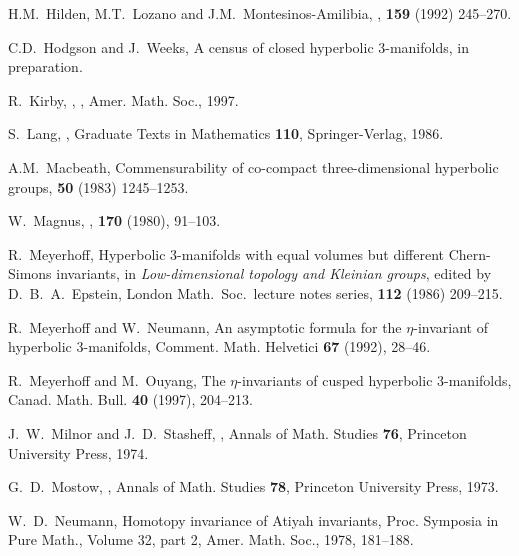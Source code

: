 \documentclass[a4paper]{amsart}
\theoremstyle{definition}
\begin{document}
\begin{thebibliography}{99}
 H.M.~Hilden, M.T.~Lozano and J.M.~Montesinos-Amilibia,
,
 {\bf159} (1992) 245--270.

C.D.~Hodgson and J.~Weeks, A census of closed hyperbolic 3-manifolds,
in preparation. 

R.~Kirby,
,
,
\newblock Amer. Math. Soc., 1997.

S.~Lang,
,
\newblock Graduate Texts in Mathematics {\bf 110}, Springer-Verlag, 1986.

A.M.~Macbeath,
\newblock Commensurability of co-compact three-dimensional hyperbolic groups,
 {\bf 50} (1983) 1245--1253.

W.~Magnus,
,
 {\bf 170} (1980), 91--103.

R.~Meyerhoff, 
\newblock  Hyperbolic 3-manifolds with equal volumes but
different Chern-Simons invariants,
\newblock in {\it Low-dimensional topology and
Kleinian groups}, edited by D.~B.~A.~Epstein, London Math.\ Soc.\
lecture notes series, {\bf112} (1986) 209--215.

R.~Meyerhoff and W.~Neumann, 
\newblock An asymptotic formula for the $\eta$-invariant 
of hyperbolic 3-manifolds,
\newblock  Comment. Math. Helvetici {\bf67} (1992), 28--46.

R.~Meyerhoff and M.~Ouyang, 
\newblock The $\eta$-invariants of cusped hyperbolic $3$-manifolds, 
\newblock Canad. Math. Bull. {\bf 40} (1997), 204--213.

J.~W.~Milnor and J.~D.~Stasheff,
, 
\newblock Annals of Math. Studies {\bf76}, Princeton
University Press, 1974.

G.~D.~Mostow,
, 
\newblock Annals of Math. Studies {\bf78}, Princeton
University Press, 1973.

W.~D.~Neumann,
\newblock Homotopy invariance of Atiyah invariants,
\newblock  Proc. Symposia
in Pure Math., Volume 32, part 2, Amer. Math. Soc., 1978, 181--188.  



\end{thebibliography}
\end{document}
